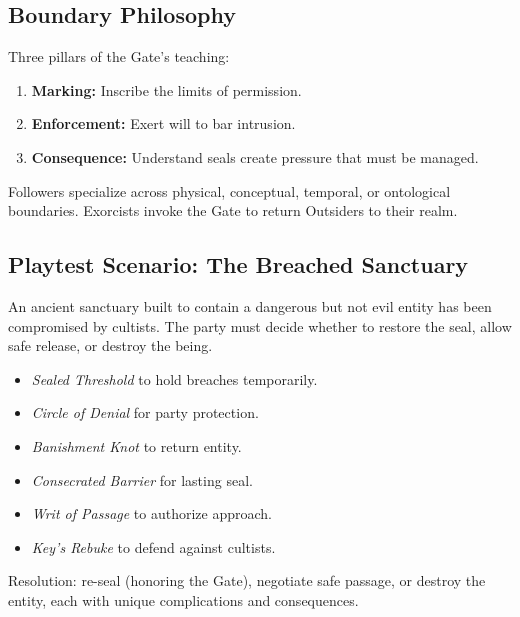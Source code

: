 \subsection*{Boundary Philosophy}
Three pillars of the Gate’s teaching:  
\begin{enumerate}
\item \textbf{Marking:} Inscribe the limits of permission.  
\item \textbf{Enforcement:} Exert will to bar intrusion.  
\item \textbf{Consequence:} Understand seals create pressure that must be managed.  
\end{enumerate}

Followers specialize across physical, conceptual, temporal, or ontological boundaries. Exorcists invoke the Gate to return Outsiders to their realm.

\subsection*{Playtest Scenario: The Breached Sanctuary}
An ancient sanctuary built to contain a dangerous but not evil entity has been compromised by cultists. The party must decide whether to restore the seal, allow safe release, or destroy the being.  

\begin{itemize}
\item \emph{Sealed Threshold} to hold breaches temporarily.  
\item \emph{Circle of Denial} for party protection.  
\item \emph{Banishment Knot} to return entity.  
\item \emph{Consecrated Barrier} for lasting seal.  
\item \emph{Writ of Passage} to authorize approach.  
\item \emph{Key’s Rebuke} to defend against cultists.  
\end{itemize}

Resolution: re-seal (honoring the Gate), negotiate safe passage, or destroy the entity, each with unique complications and consequences.
